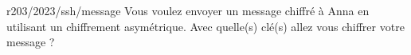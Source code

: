 \begin{question}{r203/2023/ssh/message}
  Vous voulez envoyer un message chiffré à Anna en utilisant un
  chiffrement asymétrique. Avec quelle(s) clé(s) allez vous chiffrer
  votre message ?
  \begin{reponses}[2]
  \end{reponses}
\end{question}
